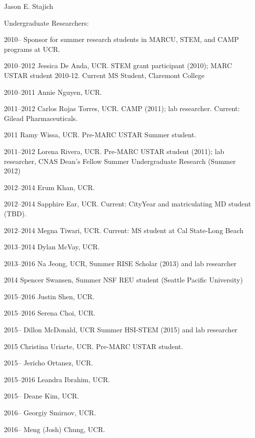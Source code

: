 \documentclass[10pt]{article}
\begin{document}
\begin{cv}{\centerline{Jason E. Stajich}}
\begin{cvlistcompact}{Undergraduate Researchers:}
\item[2010--] Sponsor for summer research students in MARCU, STEM, and CAMP
  programs at UCR.
\item [2010--2012] Jessica De Anda, UCR. STEM grant participant
  (2010); MARC USTAR student 2010-12. Current MS Student, Claremont College
\item [2010--2011] Annie Nguyen, UCR.
\item [2011--2012] Carlos Rojas Torres, UCR. CAMP (2011); lab
  researcher. Current: Gilead Pharmaceuticals.
\item [2011] Ramy Wissa, UCR. Pre-MARC USTAR Summer student.
\item [2011--2012] Lorena Rivera, UCR. Pre-MARC USTAR student (2011); lab
  researcher, CNAS Dean's Fellow Summer Undergraduate Research (Summer 2012)
\item [2012--2014] Erum Khan, UCR.
\item [2012--2014] Sapphire Ear, UCR. Current: CityYear and
  matriculating MD student (TBD).
\item [2012--2014] Megna Tiwari, UCR. Current: MS student at Cal
  State-Long Beach
\item [2013--2014] Dylan McVay, UCR.
\item [2013--2016] Na Jeong, UCR, Summer RISE Scholar (2013) and lab researcher
\item [2014] Spencer Swansen, Summer NSF REU student (Seattle Pacific University)
\item [2015--2016] Justin Shen, UCR.
\item [2015--2016] Serena Choi, UCR.
\item [2015--] Dillon McDonald, UCR Summer HSI-STEM (2015) and lab researcher
\item [2015] Christina Uriarte, UCR. Pre-MARC USTAR student.
\item [2015--] Jericho Ortanez, UCR.
\item [2015--2016] Leandra Ibrahim, UCR.
\item [2015--] Deane Kim, UCR.
\item [2016--] Georgiy Smirnov, UCR.
\item [2016--] Meng (Josh) Chung, UCR.
  
\end{cvlistcompact}


\end{cv}
\end{document}
